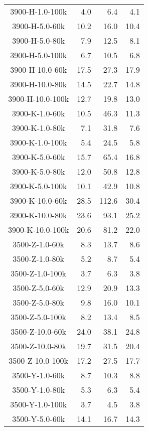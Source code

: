 \begin{longtable}{crrr}
    3900-H-1.0-100k  &    4.0 &    6.4 &    4.1 \\
    3900-H-5.0-60k   &   10.2 &   16.0 &   10.4 \\
    3900-H-5.0-80k   &    7.9 &   12.5 &    8.1 \\
    3900-H-5.0-100k  &    6.7 &   10.5 &    6.8 \\
    3900-H-10.0-60k  &   17.5 &   27.3 &   17.9 \\
    3900-H-10.0-80k  &   14.5 &   22.7 &   14.8 \\
    3900-H-10.0-100k &   12.7 &   19.8 &   13.0 \\
    3900-K-1.0-60k   &   10.5 &   46.3 &   11.3 \\
    3900-K-1.0-80k   &    7.1 &   31.8 &    7.6 \\
    3900-K-1.0-100k  &    5.4 &   24.5 &    5.8 \\
    3900-K-5.0-60k   &   15.7 &   65.4 &   16.8 \\
    3900-K-5.0-80k   &   12.0 &   50.8 &   12.8 \\
    3900-K-5.0-100k  &   10.1 &   42.9 &   10.8 \\
    3900-K-10.0-60k  &   28.5 &  112.6 &   30.4 \\
    3900-K-10.0-80k  &   23.6 &   93.1 &   25.2 \\
    3900-K-10.0-100k &   20.6 &   81.2 &   22.0 \\
    3500-Z-1.0-60k   &    8.3 &   13.7 &    8.6 \\
    3500-Z-1.0-80k   &    5.2 &    8.7 &    5.4 \\
    3500-Z-1.0-100k  &    3.7 &    6.3 &    3.8 \\
    3500-Z-5.0-60k   &   12.9 &   20.9 &   13.3 \\
    3500-Z-5.0-80k   &    9.8 &   16.0 &   10.1 \\
    3500-Z-5.0-100k  &    8.2 &   13.4 &    8.5 \\
    3500-Z-10.0-60k  &   24.0 &   38.1 &   24.8 \\
    3500-Z-10.0-80k  &   19.7 &   31.5 &   20.4 \\
    3500-Z-10.0-100k &   17.2 &   27.5 &   17.7 \\
    3500-Y-1.0-60k   &    8.7 &   10.3 &    8.8 \\
    3500-Y-1.0-80k   &    5.3 &    6.3 &    5.4 \\
    3500-Y-1.0-100k  &    3.7 &    4.5 &    3.8 \\
    3500-Y-5.0-60k   &   14.1 &   16.7 &   14.3 \\

\end{longtable}
